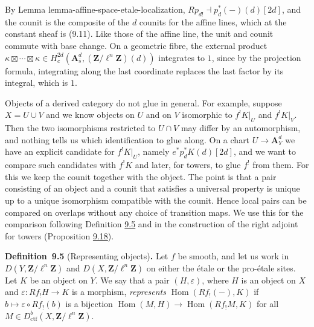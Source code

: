 \documentclass[11pt]{article}
\newenvironment{bpstatement}[2]{\par\addvspace{0.6\baselineskip}\noindent\textbf{#1}#2\textbf{.}\enspace\ignorespaces}
  {\par\addvspace{0.4\baselineskip}}
\begin{document}
By Lemma lemma-affine-space-etale-localization, \(Rp_{d!}\dashv
p_d^*(-)(d)[2d]\), and the counit is the composite of the \(d\) counits for the affine lines, which at the constant sheaf is (9.11). Like those of the affine line, the unit and counit commute with base change. On a geometric fibre, the external product \(\kappa\boxtimes\cdots\boxtimes\kappa\in
H_c^{2d}(\mathbf A^d_{\bar s},(\mathbf Z/\ell^n\mathbf Z)(d))\) integrates to \(1\), since by the projection formula, integrating along the last coordinate replaces the last factor by its integral, which is \(1\).

Objects of a derived category do not glue in general. For example, suppose \(X=U\cup V\) and we know objects on \(U\) and on \(V\) isomorphic to \(f^!K|_U\) and \(f^!K|_V\). Then the two isomorphisms restricted to \(U\cap V\) may differ by an automorphism, and nothing tells us which identification to glue along. On a chart \(U\to\mathbf A^d_Y\) we have an explicit candidate for \(f^!K|_U\), namely \(e^*p_d^*K(d)[2d]\), and we want to compare such candidates with \(f^!K\) and later, for towers, to glue \(f^!\) from them. For this we keep the counit together with the object. The point is that a pair consisting of an object and a counit that satisfies a universal property is unique up to a unique isomorphism compatible with the counit. Hence local pairs can be compared on overlaps without any choice of transition maps. We use this for the comparison following Definition \hyperref[bp19]{9.5} and in the construction of the right adjoint for towers (Proposition \hyperref[bp60]{9.18}).

\label{bp19}%
\begin{bpstatement}{Definition~9.5}{ (Representing objects)}
Let \(f\) be smooth, and let us work in \(D(Y,\mathbf Z/\ell^n\mathbf Z)\) and \(D(X,\mathbf Z/\ell^n\mathbf Z)\) on either the étale or the pro-étale sites. Let \(K\) be an object on \(Y\). We say that a pair \((H,\varepsilon)\), where \(H\) is an object on \(X\) and \(\varepsilon:Rf_!H\to K\) is a morphism, \emph{represents} \(\operatorname{Hom}(Rf_!(-),K)\) if \(b\mapsto\varepsilon\circ Rf_!(b)\) is a bijection \(\operatorname{Hom}(M,H)\to\operatorname{Hom}(Rf_!M,K)\) for all \(M\in D^b_{\mathrm{ctf}}(X,\mathbf Z/\ell^n\mathbf Z)\).
\end{bpstatement}
\end{document}
